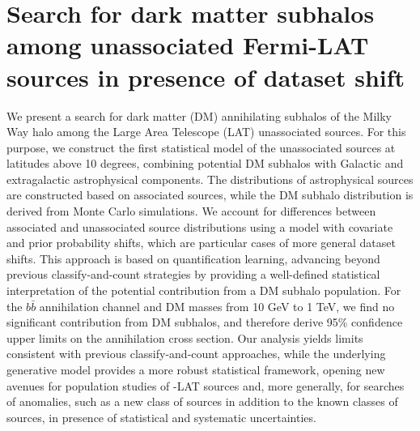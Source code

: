 ﻿%
%
\chapter{Search for dark matter subhalos among unassociated Fermi-LAT sources in presence of dataset shift}
\label{ch:dm_halos}

We present a search for dark matter (DM) annihilating subhalos of the Milky Way halo among the {\Fermi} Large Area Telescope (LAT) unassociated sources. For this purpose, we construct the first statistical model of the unassociated sources at latitudes above 10 degrees, combining potential DM subhalos with Galactic and extragalactic astrophysical components. 
The distributions of astrophysical sources are constructed based on associated sources, while the DM subhalo distribution is derived from Monte Carlo simulations. We account for differences between associated and unassociated source distributions using a model with covariate and prior probability shifts, which are particular cases of more general dataset shifts. 
This approach is based on quantification learning, advancing beyond previous classify-and-count strategies by providing a well-defined statistical interpretation of the potential contribution from a DM subhalo population. 
For the $b\bar{b}$ annihilation channel and DM masses from 10 GeV to 1 TeV, we find no significant contribution from DM subhalos, and therefore derive 95\% confidence upper limits on the annihilation cross section.
Our analysis yields limits consistent with previous classify-and-count approaches, 
while the underlying generative model provides a more robust statistical framework, opening new avenues for population studies of \Fermi-LAT sources and, more generally, for searches of anomalies, such as a new class of sources in addition to the known classes of sources, in presence of statistical and systematic uncertainties.







\begin{subappendices}



\end{subappendices}
